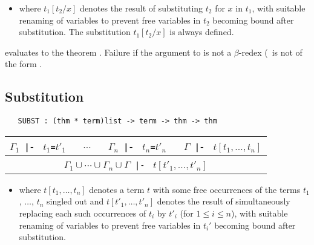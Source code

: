 \begin{itemize}
\item where $t_1[t_2/x]$ denotes the result of substituting $t_2$ for $x$
in $t_1$, with suitable renaming of variables to prevent free variables
in $t_2$ becoming bound after substitution. The substitution
 $t_1[t_2/x]$ is always defined.
\end{itemize}

\noindent {} %
evaluates to the theorem .
Failure if the argument to  is not a $\beta$-redex
(\ie\ is not of the form .

\bigskip

\subsection{Substitution}

\begin{holboxed}
\begin{verbatim}
   SUBST : (thm * term)list -> term -> thm -> thm
\end{verbatim}\end{holboxed}

\begin{center}
\begin{tabular}{c}
$\Gamma_1${\small\verb+ |- +} $t_1${\small\verb+=+}$t'_1$ {\small\verb+  +} $\cdots$ {\small\verb+  +}
$\Gamma_n${\small\verb+ |- +} $t_n${\small\verb+=+}$t'_n$ {\small\verb+  +}
$\Gamma${\small\verb+ |- +} $t[t_1,\ldots,t_n]$ \\ \hline
$\Gamma_1 \cup \cdots
\cup \Gamma_n \cup \Gamma${\small\verb+ |- +} $t[t'_1,\ldots,t'_n]$ \\
\end{tabular}
\end{center}

\bigskip

\begin{itemize}
\item where $t[t_1,\ldots,t_n]$ denotes a term $t$ with some free
occurrences of the terms $t_1$, $\dots$, $t_n$ singled out and
$t[t'_1,\ldots,t'_n]$ denotes the result of simultaneously replacing each
such occurrences of $t_i$ by $t'_i$ (for $1{\leq}i {\leq} n$),
with suitable renaming of variables to prevent free variables
in $t_i'$ becoming bound after substitution.
\end{itemize}

